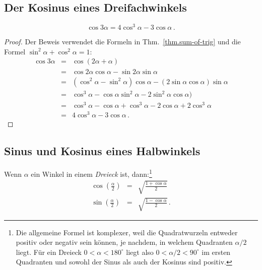 \subsection{Der Kosinus eines Dreifachwinkels}\label{s.cosine}
\begin{theorem}\label{thm.triple-angle}
\[
\cos 3\alpha=4\cos^3\alpha -3\cos\alpha\,.
\]
\end{theorem}
\begin{proof}
Der Beweis verwendet die Formeln in Thm.~\ref{thm.sum-of-trig} und die Formel $\sin^2\alpha+\cos^2\alpha=1$:
\begin{eqnarray*}
\cos 3\alpha &=& \cos (2\alpha +\alpha)\\
&=& \cos 2\alpha\cos\alpha - \sin 2\alpha\sin\alpha\\
&=& (\cos^2\alpha -\sin^2\alpha)\cos\alpha - (2\sin\alpha\cos\alpha)\sin\alpha\\
&=&\cos^3\alpha - \cos\alpha\sin^2\alpha -2\sin^2\alpha\cos\alpha)\\
&=&\cos^3\alpha - \cos\alpha +\cos^3\alpha -2\cos\alpha+2\cos^3\alpha\\
&=&4\cos^3\alpha -3\cos\alpha\,.
\end{eqnarray*}
\end{proof}


\subsection{Sinus und Kosinus eines Halbwinkels}\label{s.sine-cosine-half}
\begin{theorem}\label{thm.sine-cosine-half}
Wenn $\alpha$ ein Winkel in einem \emph{Dreieck} ist, dann:\footnote{Die allgemeine Formel ist komplexer, weil die Quadratwurzeln entweder positiv oder negativ sein können, je nachdem, in welchem Quadranten $\alpha/2$ liegt. Für ein Dreieck $0\!<\!\alpha\!<\!180^\circ$ liegt also $0\!<\!\alpha/2\!<\!90^\circ$ im ersten Quadranten und sowohl der Sinus als auch der Kosinus sind positiv.}
\begin{eqnarray*}
\cos \left(\frac{\alpha}{2}\right)&=&\sqrt{\frac{1+\cos\alpha}{2}}\\
\sin\left(\frac{\alpha}{2}\right)&=&\sqrt{\frac{1-\cos\alpha}{2}}\,.
\end{eqnarray*}
\end{theorem}

